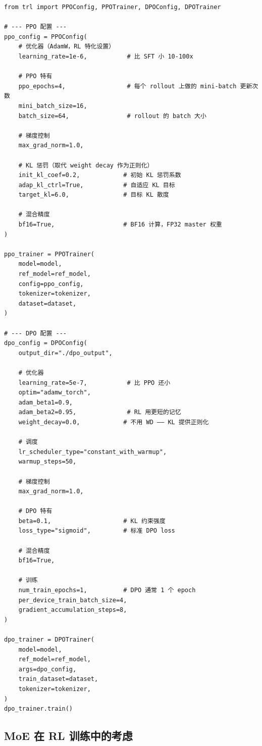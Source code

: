 \begin{lstlisting}[style=pythonstyle, caption={使用 TRL 的完整 PPO 与 DPO 优化器配置。}]
from trl import PPOConfig, PPOTrainer, DPOConfig, DPOTrainer

# --- PPO 配置 ---
ppo_config = PPOConfig(
    # 优化器（AdamW，RL 特化设置）
    learning_rate=1e-6,           # 比 SFT 小 10-100x

    # PPO 特有
    ppo_epochs=4,                 # 每个 rollout 上做的 mini-batch 更新次数
    mini_batch_size=16,
    batch_size=64,                # rollout 的 batch 大小

    # 梯度控制
    max_grad_norm=1.0,

    # KL 惩罚（取代 weight decay 作为正则化）
    init_kl_coef=0.2,            # 初始 KL 惩罚系数
    adap_kl_ctrl=True,           # 自适应 KL 目标
    target_kl=6.0,               # 目标 KL 散度

    # 混合精度
    bf16=True,                   # BF16 计算，FP32 master 权重
)

ppo_trainer = PPOTrainer(
    model=model,
    ref_model=ref_model,
    config=ppo_config,
    tokenizer=tokenizer,
    dataset=dataset,
)

# --- DPO 配置 ---
dpo_config = DPOConfig(
    output_dir="./dpo_output",

    # 优化器
    learning_rate=5e-7,           # 比 PPO 还小
    optim="adamw_torch",
    adam_beta1=0.9,
    adam_beta2=0.95,              # RL 用更短的记忆
    weight_decay=0.0,            # 不用 WD —— KL 提供正则化

    # 调度
    lr_scheduler_type="constant_with_warmup",
    warmup_steps=50,

    # 梯度控制
    max_grad_norm=1.0,

    # DPO 特有
    beta=0.1,                    # KL 约束强度
    loss_type="sigmoid",         # 标准 DPO loss

    # 混合精度
    bf16=True,

    # 训练
    num_train_epochs=1,          # DPO 通常 1 个 epoch
    per_device_train_batch_size=4,
    gradient_accumulation_steps=8,
)

dpo_trainer = DPOTrainer(
    model=model,
    ref_model=ref_model,
    args=dpo_config,
    train_dataset=dataset,
    tokenizer=tokenizer,
)
dpo_trainer.train()
\end{lstlisting}

\subsection{MoE 在 RL 训练中的考虑}
\label{moe-considerations-for-rl-training}

